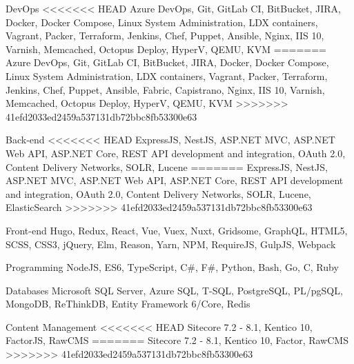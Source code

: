 

\begin{cvskills}

  \cvskill
    {DevOps} %
<<<<<<< HEAD
    {Azure DevOps, Git, GitLab CI, BitBucket, JIRA, Docker, Docker Compose, Linux System Administration, LDX containers, Vagrant, Packer, Terraform, Jenkins, Chef, Puppet, Ansible, Nginx, IIS 10, Varnish, Memcached, Octopus Deploy, HyperV, QEMU, KVM} %
=======
    {Azure DevOps, Git, GitLab CI, BitBucket, JIRA, Docker, Docker Compose, Linux System Administration, LDX containers, Vagrant, Packer, Terraform, Jenkins, Chef, Puppet, Ansible, Fabric, Capistrano, Nginx, IIS 10, Varnish, Memcached, Octopus Deploy, HyperV, QEMU, KVM} %
>>>>>>> 41efd2033ed2459a537131db72bbc8fb53300e63

  \cvskill
    {Back-end} %
<<<<<<< HEAD
    {ExpressJS, NestJS, ASP.NET MVC, ASP.NET Web API, ASP.NET Core, REST API development and integration, OAuth 2.0, Content Delivery Networks, SOLR, Lucene} %
=======
    {ExpressJS, NestJS, ASP.NET MVC, ASP.NET Web API, ASP.NET Core, REST API development and integration, OAuth 2.0, Content Delivery Networks, SOLR, Lucene, ElasticSearch} %
>>>>>>> 41efd2033ed2459a537131db72bbc8fb53300e63

  \cvskill
    {Front-end} %
    {Hugo, Redux, React, Vue, Vuex, Nuxt, Gridsome, GraphQL, HTML5, SCSS, CSS3, jQuery, Elm, Reason, Yarn, NPM, RequireJS, GulpJS, Webpack} %

  \cvskill
    {Programming} %
    {NodeJS, ES6, TypeScript, C\#, F\#, Python, Bash, Go, C, Ruby} %

  \cvskill
    {Databases} %
    {Microsoft SQL Server, Azure SQL, T-SQL, PostgreSQL, PL/pgSQL, MongoDB, ReThinkDB, Entity Framework 6/Core, Redis} %

  \cvskill
    {Content Management} %
<<<<<<< HEAD
    {Sitecore 7.2 - 8.1, Kentico 10, FactorJS, RawCMS} %
=======
    {Sitecore 7.2 - 8.1, Kentico 10, Factor, RawCMS} %
>>>>>>> 41efd2033ed2459a537131db72bbc8fb53300e63


\end{cvskills}
